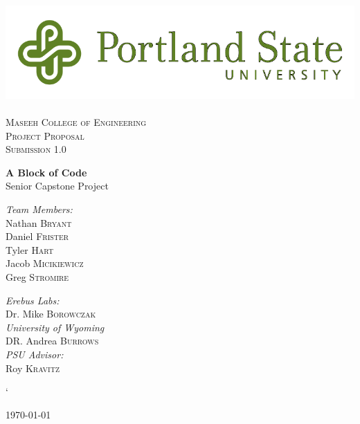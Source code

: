 
\usepackage{pstricks}
\linespread{1.1}

\begin{titlepage}
\begin{center}

\includegraphics[width=.75\textwidth]{./PSU_logo.png}~\\[.5cm]

\textsc{\LARGE \color{PSU} Maseeh College of Engineering}\\[1.5cm]

\textsc{\Large Project Proposal}\\[0.5cm]
\textsc{\Large Submission 1.0}\\[0.5cm]
\vspace{1cm}

{ \huge \bfseries\color{PSU} A Block of Code\\[0.4cm] }
  \large Senior Capstone Project

\vspace{2.5cm}
 \begin{multicols}{2}

\begin{flushleft}
\noindent
 \large
\emph{\color{PSU}Team Members:}\\
Nathan \textsc{Bryant}\\
Daniel \textsc{Frister}\\
Tyler  \textsc{Hart}\\
Jacob   \textsc{Micikiewicz}\\
Greg    \textsc{Stromire}\\
\end{flushleft}

 \begin{flushleft}
  \large
 \emph{\color{PSU}Erebus Labs:} \\
 Dr. Mike  \textsc{Borowczak}\\
 \emph{\color{PSU}University of Wyoming}\\
 DR. Andrea \textsc{Burrows}\\
 \emph{\color{PSU}PSU Advisor:}\\
 Roy \textsc{Kravitz}
 \end{flushleft}


 \end{multicols}`
\vfill

{\large \today}

\end{center}
\end{titlepage}
 \tableofcontents

